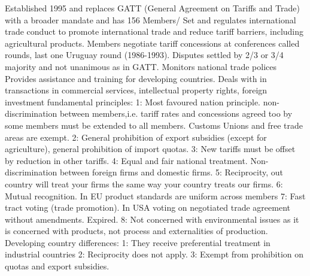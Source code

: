 \documentclass[12pt]{examnotes}
\begin{document}
\ra Established 1995 and replaces GATT (General Agreement on Tariffs and Trade) with a broader mandate and has 156 Members/
\ra Set and regulates international trade conduct to promote international trade and reduce tariff barriers, including agricultural products.
\ra Members negotiate tariff concessions at conferences called rounds, last one Uruguay round (1986-1993).
\ra Disputes settled by 2/3 or 3/4 majority and not unanimous as in GATT.
\ra Monitors national trade polices
\ra Provides assistance and training for developing countries.
\ra Deals with in transactions in commercial services, intellectual property rights, foreign investment
\ra fundamental principles:
1: Most favoured nation principle. non-discrimination between members,i.e. tariff rates and concessions agreed too  by some members must be extended to all members. Customs Unions and free trade areas are exempt.
2: General prohibition of export subsidies (except for agriculture), general prohibition of import quotas.
3: New tariffs must be offset by reduction in other tariffs.
4: Equal and fair national treatment. Non-discrimination between foreign firms and domestic firms. 
5: Reciprocity, out country will treat your firms the same way your country treats our firms.
6: Mutual recognition. In EU product standards are uniform across members
7: Fast tract voting (trade promotion). In USA voting on negotiated trade agreement without amendments. Expired.
8: Not concerned with environmental issues as it is concerned with products, not process and externalities of production.
\ra Developing country differences: 
1: They receive preferential treatment in industrial countries
2: Reciprocity does not apply.
3: Exempt from prohibition on quotas and export subsidies.
\end{document}

